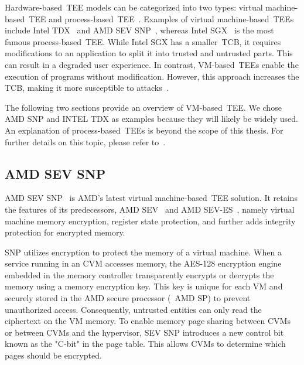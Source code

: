 Hardware-based~\acrshort{TEE} models can be categorized into two types: virtual machine-based~\acrshort{TEE} and process-based~\acrshort{TEE}~\cite*{10.3389/fcomp.2022.930741}. Examples of virtual machine-based~\acrshort{TEE}s include Intel TDX~\cite*{Intel_tdx_whitepaper} and AMD SEV SNP~\cite*{SEV_SNP_white_book}, whereas Intel SGX~\cite*{INTEL_SGX} is the most famous process-based~\acrshort{TEE}. 
While Intel SGX has a smaller~\acrshort{TCB}, it requires modifications to an application to split it into trusted and untrusted parts. This can result in a degraded user experience. In contrast, VM-based~\acrshort{TEE}s enable the execution of programs without modification. However, this approach increases the 
\acrshort{TCB}, making it more susceptible to attacks~\cite*{Execution_Environment_landscape}.

The following two sections provide an overview of VM-based~\acrshort{TEE}. We chose AMD SNP and INTEL TDX as examples because they will likely be widely used. An explanation of process-based~\acrshort{TEE}s is beyond the scope of this thesis. For further details on this topic, please refer to~\cite*{cryptoeprint:2016/086, 10.1145/2487726.2488370}.


\subsection{AMD SEV SNP}

AMD SEV SNP~\cite*{SEV_SNP_white_book} is AMD's latest virtual machine-based~\acrshort{TEE} solution. It retains the features of its predecessors, AMD SEV~\cite*{sev} and AMD SEV-ES~\cite*{sev_es}, namely virtual machine memory encryption, register state protection, and further adds integrity protection for 
encrypted memory.


SNP utilizes encryption to protect the memory of a virtual machine. When a service running in an \acrshort{CVM} accesses memory, the AES-128 encryption engine embedded in the memory controller transparently encrypts or decrypts the memory using a memory encryption key.  This key is unique for each 
VM and securely stored in the AMD secure processor (~\acrshort{AMD SP}) to prevent unauthorized access. Consequently, untrusted entities can only read the ciphertext on the VM memory. To enable memory page sharing between \acrshort{CVM}s or between \acrshort{CVM}s and the hypervisor, SEV SNP introduces a new 
control bit known as the "C-bit" in the page table. This allows \acrshort{CVM}s to determine which pages should be encrypted.


